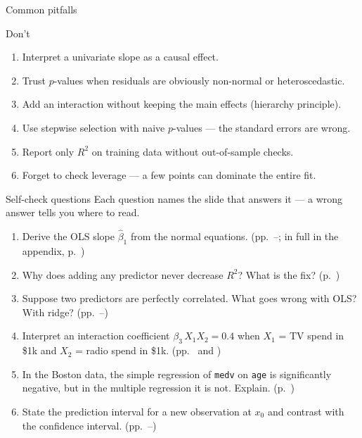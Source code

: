 \documentclass[aspectratio=169,11pt]{beamer}
\begin{document}
\begin{frame}{Common pitfalls}
  \begin{alertblock}{Don't}
    \begin{enumerate}
      \item Interpret a univariate slope as a causal effect.
      \item Trust $p$-values when residuals are obviously non-normal or
            heteroscedastic.
      \item Add an interaction without keeping the main effects
            (hierarchy principle).
      \item Use stepwise selection with naive $p$-values --- the
            standard errors are wrong.
      \item Report only $R^2$ on training data without out-of-sample
            checks.
      \item Forget to check leverage --- a few points can dominate the
            entire fit.
    \end{enumerate}
  \end{alertblock}
\end{frame}

\begin{frame}{Self-check questions}
  Each question names the slide that answers it --- a wrong answer tells you
  where to read.
  \begin{enumerate}
    \item Derive the OLS slope $\hat\beta_1$ from the normal equations.
          (pp.~\pageref{frm:deriveslope}--\pageref{frm:deriveint}; in full in the appendix, p.~\pageref{frm:ee3l2})
    \item Why does adding any predictor never decrease $R^2$? What is
          the fix? (p.~\pageref{frm:r2mis})
    \item Suppose two predictors are perfectly correlated. What goes
          wrong with OLS? With ridge? (pp.~\pageref{frm:collin}--\pageref{frm:vif})
    \item Interpret an interaction coefficient
          $\beta_3\,X_1 X_2 = 0.4$ when $X_1$ = TV spend in \$1k and
          $X_2$ = radio spend in \$1k. (pp.~\pageref{frm:interact} and \pageref{frm:interadv})
    \item In the Boston data, the simple regression of \texttt{medv}
          on \texttt{age} is significantly negative, but in the
          multiple regression it is not. Explain. (p.~\pageref{frm:confound})
    \item State the prediction interval for a new observation at $x_0$
          and contrast with the confidence interval. (pp.~\pageref{frm:predint}--\pageref{frm:bands})
  \end{enumerate}
\end{frame}
\end{document}
